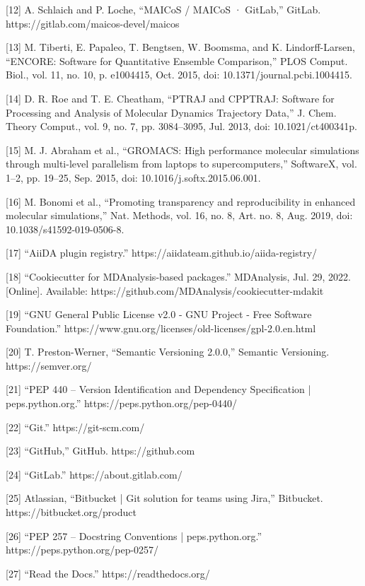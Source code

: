 \documentclass{article}
\begin{document}
[12]    A. Schlaich and P. Loche, “MAICoS / MAICoS · GitLab,” GitLab. https://gitlab.com/maicos-devel/maicos

[13]    M. Tiberti, E. Papaleo, T. Bengtsen, W. Boomsma, and K. Lindorff-Larsen, “ENCORE: Software for Quantitative Ensemble Comparison,” PLOS Comput. Biol., vol. 11, no. 10, p. e1004415, Oct. 2015, doi: 10.1371/journal.pcbi.1004415.

[14]    D. R. Roe and T. E. Cheatham, “PTRAJ and CPPTRAJ: Software for Processing and Analysis of Molecular Dynamics Trajectory Data,” J. Chem. Theory Comput., vol. 9, no. 7, pp. 3084–3095, Jul. 2013, doi: 10.1021/ct400341p.

[15]    M. J. Abraham et al., “GROMACS: High performance molecular simulations through multi-level parallelism from laptops to supercomputers,” SoftwareX, vol. 1–2, pp. 19–25, Sep. 2015, doi: 10.1016/j.softx.2015.06.001.

[16]    M. Bonomi et al., “Promoting transparency and reproducibility in enhanced molecular simulations,” Nat. Methods, vol. 16, no. 8, Art. no. 8, Aug. 2019, doi: 10.1038/s41592-019-0506-8.

[17]    “AiiDA plugin registry.” https://aiidateam.github.io/aiida-registry/

[18]    “Cookiecutter for MDAnalysis-based packages.” MDAnalysis, Jul. 29, 2022. [Online]. Available: https://github.com/MDAnalysis/cookiecutter-mdakit

[19]    “GNU General Public License v2.0 - GNU Project - Free Software Foundation.” https://www.gnu.org/licenses/old-licenses/gpl-2.0.en.html

[20]    T. Preston-Werner, “Semantic Versioning 2.0.0,” Semantic Versioning. https://semver.org/

[21]    “PEP 440 – Version Identification and Dependency Specification | peps.python.org.” https://peps.python.org/pep-0440/

[22]    “Git.” https://git-scm.com/

[23]    “GitHub,” GitHub. https://github.com

[24]    “GitLab.” https://about.gitlab.com/

[25]    Atlassian, “Bitbucket | Git solution for teams using Jira,” Bitbucket. https://bitbucket.org/product

[26]    “PEP 257 – Docstring Conventions | peps.python.org.” https://peps.python.org/pep-0257/

[27]    “Read the Docs.” https://readthedocs.org/
\end{document}
